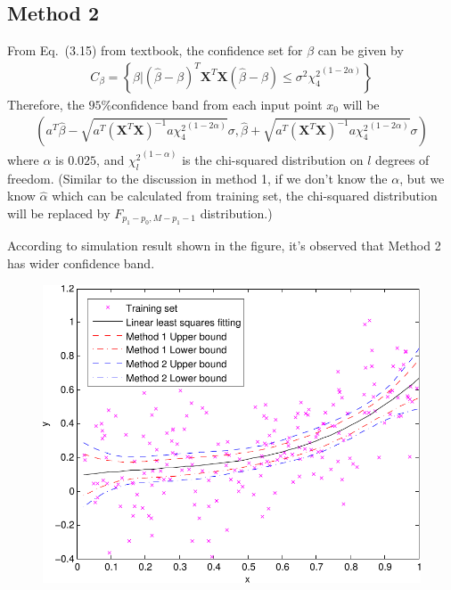 \documentclass[pra,groupedaddress,amsmath,amssymb, column]{revtex4}
\begin{document}
\subsection*{Method 2}
From Eq.~(3.15) from textbook, the confidence set for $\beta$ can be given by
\begin{align}
C_\beta = \left\{\beta|(\hat{\beta}-\beta)^T\mathbf{X}^T\mathbf{X}(\hat{\beta}-\beta)\le {\sigma}^2{\chi^2_4}^{(1-2\alpha)}\right\}
\end{align}
Therefore, the $95\%$confidence band from each input point $x_0$ will be
\begin{align}
\left( a^T\hat{\beta} -\sqrt{a^T(\mathbf{X}^T\mathbf{X})^{-1}a{\chi^2_4}^{(1-2\alpha)}}{\sigma},  \hat{\beta} + \sqrt{a^T(\mathbf{X}^T\mathbf{X})^{-1}a{\chi^2_4}^{(1-2\alpha)}}{\sigma}\right)
\end{align}
where  $\alpha$ is $0.025$, and ${\chi_l^2}^{(1-\alpha)}$ is the chi-squared distribution on $l$ degrees of freedom. (Similar to the discussion in method 1, if we don't know the $\alpha$, but we know $\hat{\alpha}$ which can be calculated from training set, the chi-squared distribution will be replaced by $F_{p_1-p_0,M-p_1-1}$ distribution.)

According to simulation result shown in the figure,  it's observed that Method 2 has wider confidence band. 
\begin{figure}
	\begin{center}
		\includegraphics[width=1.\textwidth]{Q5.pdf} 
	\end{center}
\end{figure}
\end{document}
